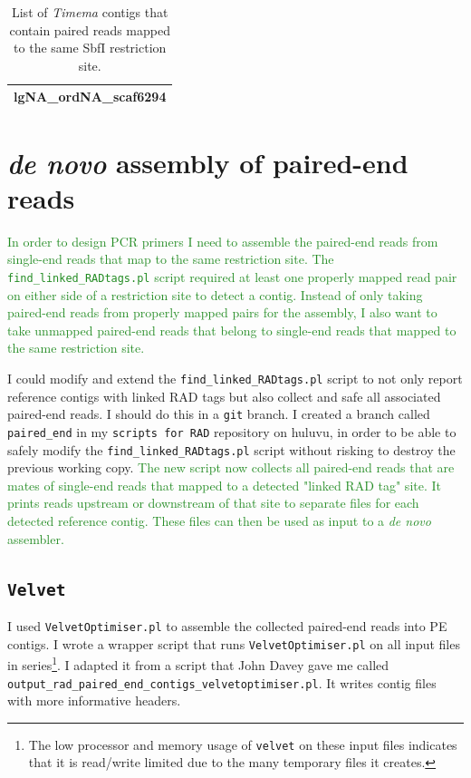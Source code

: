 \documentclass{article}\usepackage[]{graphicx}\usepackage[]{color}
\newcommand{\roger}[1]{ \textcolor[named]{ForestGreen}{#1} }
\begin{document}
\begin{table}[h!]
\centering
\caption{List of \textit{Timema} contigs that contain paired reads mapped to the same SbfI restriction site.}
\begin{tabular}{l}
\toprule
lgNA\_ordNA\_scaf6294 \\
\bottomrule
\end{tabular}
\label{linked_RADtag_contigs_Timema}
\end{table}

\section{\textit{de novo} assembly of paired-end reads}
\roger{In order to design PCR primers I need to assemble the paired-end reads from single-end reads that map to the same restriction site. The \texttt{find\_linked\_RADtags.pl} script required at least one properly mapped read pair on either side of a restriction site to detect a contig. Instead of only taking paired-end reads from properly mapped pairs for the assembly, I also want to take unmapped paired-end reads that belong to single-end reads that mapped to the same restriction site.}

I could modify and extend the \texttt{find\_linked\_RADtags.pl} script to not only report reference contigs with linked RAD tags but also collect and safe all associated paired-end reads. I should do this in a \texttt{git} branch. I created a branch called \texttt{paired\_end} in my \texttt{scripts for RAD} repository on huluvu, in order to be able to safely modify the \texttt{find\_linked\_RADtags.pl} script without risking to destroy the previous working copy. \roger{The new script now collects all paired-end reads that are mates of single-end reads that mapped to a detected "linked RAD tag" site. It prints reads upstream or downstream of that site to separate files for each detected reference contig. These files can then be used as input to a \textit{de novo} assembler.}


\subsection{\texttt{Velvet}}
I used \texttt{VelvetOptimiser.pl} to assemble the collected paired-end reads into PE contigs. I wrote a wrapper script that runs \texttt{VelvetOptimiser.pl} on all input files in series\footnote{The low processor and memory usage of \texttt{velvet} on these input files indicates that it is read/write limited due to the many temporary files it creates.}. I adapted it from a script that John Davey gave me called \texttt{output\_rad\_paired\_end\_contigs\_velvetoptimiser.pl}. It writes contig files with more informative headers.
\end{document}
